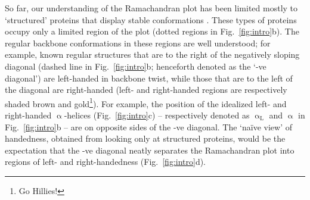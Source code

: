 \documentclass[fleqn,10pt,lineno]{wlpeerj} %
\newcommand{\n}[1]{{\color{blue}#1}}
\newcommand{\Fig}[1]{Fig.~\ref{#1}}
\begin{document}
So far, our understanding of the Ramachandran plot has been limited mostly to \n{`structured' proteins that display stable conformations \citep{Berman2000,Alberts2002}. These types of proteins occupy only a limited region of the plot (dotted regions in \Fig{fig:intro}b). The regular backbone conformations in these regions are well understood; for example, known regular structures that are to the right of the negatively sloping diagonal (dashed line in \Fig{fig:intro}b; henceforth denoted as the `-ve diagonal') are left-handed in backbone twist, while those that are to the left of the diagonal are right-handed (left- and right-handed regions are respectively shaded brown and gold\footnote{Go Hillies!}).} For example, the position of the idealized left- and right-handed $\upalpha$-helices (\Fig{fig:intro}c) -- respectively denoted as $\upalpha_\textrm{L}$ and $\upalpha$ in \Fig{fig:intro}b -- are on opposite sides of the -ve diagonal. \n{The `na{\"i}ve view' of handedness, obtained from looking only at structured proteins, would be the expectation that the -ve diagonal neatly separates the Ramachandran plot into regions of left- and right-handedness (\Fig{fig:intro}d).}

\end{document}
